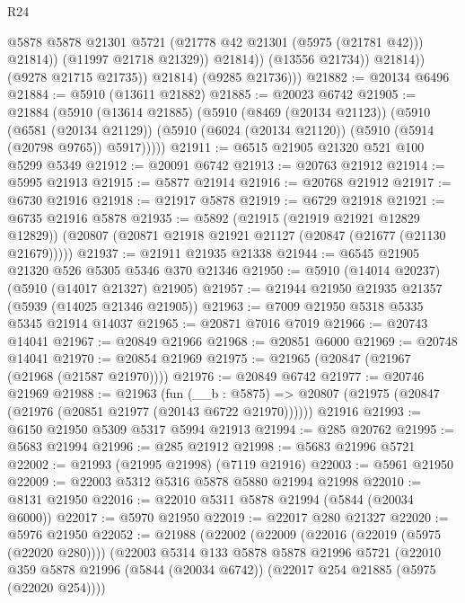 \begin{lexlean}{R24}
\begin{coremodule}
                            @5878
                            @5878
                            @21301
                            @5721
                            (@21778 @42 @21301 (@5975 (@21781 @42)))
                            @21814))
                        (@11997 @21718 @21329))
                      @21814))
                  (@13556 @21734))
                @21814))
            (@9278 @21715 @21735))
          @21814)
        (@9285 @21736)))
@21882 := @20134 @6496
@21884 := @5910 (@13611 @21882)
@21885 := @20023 @6742
@21905 := @21884
    (@5910
      (@13614 @21885)
      (@5910
        (@8469 (@20134 @21123))
        (@5910
          (@6581 (@20134 @21129))
          (@5910 (@6024 (@20134 @21120)) (@5910 (@5914 (@20798 @9765)) @5917)))))
@21911 := @6515 @21905 @21320 @521 @100 @5299 @5349
@21912 := @20091 @6742
@21913 := @20763 @21912
@21914 := @5995 @21913
@21915 := @5877 @21914
@21916 := @20768 @21912
@21917 := @6730 @21916
@21918 := @21917 @5878
@21919 := @6729 @21918
@21921 := @6735 @21916 @5878
@21935 := @5892
    (@21915 (@21919 @21921 @12829 @12829))
    (@20807 (@20871 @21918 @21921 @21127 (@20847 (@21677 (@21130 @21679)))))
@21937 := @21911 @21935 @21338
@21944 := @6545 @21905 @21320 @526 @5305 @5346 @370 @21346
@21950 := @5910 (@14014 @20237) (@5910 (@14017 @21327) @21905)
@21957 := @21944 @21950 @21935 @21357 (@5939 (@14025 @21346 @21905))
@21963 := @7009 @21950 @5318 @5335 @5345 @21914 @14037
@21965 := @20871 @7016 @7019
@21966 := @20743 @14041
@21967 := @20849 @21966
@21968 := @20851 @6000
@21969 := @20748 @14041
@21970 := @20854 @21969
@21975 := @21965 (@20847 (@21967 (@21968 (@21587 @21970))))
@21976 := @20849 @6742
@21977 := @20746 @21969
@21988 := @21963
    (fun (__b : @5875) => @20807 (@21975 (@20847 (@21976 (@20851 @21977 (@20143 @6722 @21970))))))
    @21916
@21993 := @6150 @21950 @5309 @5317 @5994 @21913
@21994 := @285 @20762
@21995 := @5683 @21994
@21996 := @285 @21912
@21998 := @5683 @21996 @5721
@22002 := @21993 (@21995 @21998) (@7119 @21916)
@22003 := @5961 @21950
@22009 := @22003 @5312 @5316 @5878 @5880 @21994 @21998
@22010 := @8131 @21950
@22016 := @22010 @5311 @5878 @21994 (@5844 (@20034 @6000))
@22017 := @5970 @21950
@22019 := @22017 @280 @21327
@22020 := @5976 @21950
@22052 := @21988
    (@22002
      (@22009
        (@22016 (@22019 (@5975 (@22020 @280))))
        (@22003
          @5314
          @133
          @5878
          @5878
          @21996
          @5721
          (@22010
            @359
            @5878
            @21996
            (@5844 (@20034 @6742))
            (@22017 @254 @21885 (@5975 (@22020 @254))))

\end{coremodule}
\end{lexlean}
